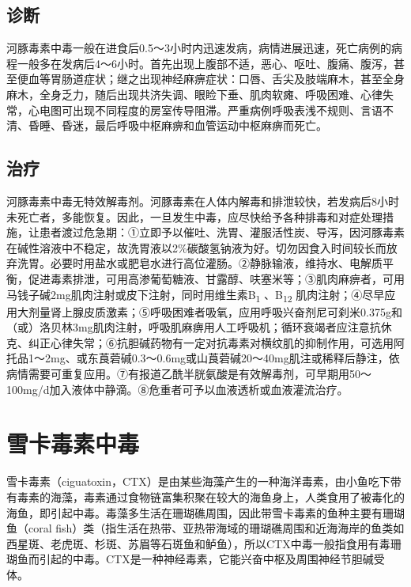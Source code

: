 \subsection{诊断}

河豚毒素中毒一般在进食后0.5～3小时内迅速发病，病情进展迅速，死亡病例的病程一般多在发病后4～6小时。首先出现上腹部不适，恶心、呕吐、腹痛、腹泻，甚至便血等胃肠道症状；继之出现神经麻痹症状：口唇、舌尖及肢端麻木，甚至全身麻木，全身乏力，随后出现共济失调、眼睑下垂、肌肉软瘫、呼吸困难、心律失常，心电图可出现不同程度的房室传导阻滞。严重病例呼吸表浅不规则、言语不清、昏睡、昏迷，最后呼吸中枢麻痹和血管运动中枢麻痹而死亡。

\subsection{治疗}

河豚毒素中毒无特效解毒剂。河豚毒素在人体内解毒和排泄较快，若发病后8小时未死亡者，多能恢复。因此，一旦发生中毒，应尽快给予各种排毒和对症处理措施，让患者渡过危急期：①立即予以催吐、洗胃、灌服活性炭、导泻，因河豚毒素在碱性溶液中不稳定，故洗胃液以2\%碳酸氢钠液为好。切勿因食入时间较长而放弃洗胃。必要时用盐水或肥皂水进行高位灌肠。②静脉输液，维持水、电解质平衡，促进毒素排泄，可用高渗葡萄糖液、甘露醇、呋塞米等；③肌肉麻痹者，可用马钱子碱2mg肌肉注射或皮下注射，同时用维生素B\textsubscript{1}
、B\textsubscript{12}
肌肉注射；④尽早应用大剂量肾上腺皮质激素；⑤呼吸困难者吸氧，应用呼吸兴奋剂尼可刹米0.375g和（或）洛贝林3mg肌肉注射，呼吸肌麻痹用人工呼吸机；循环衰竭者应注意抗休克、纠正心律失常；⑥抗胆碱药物有一定对抗毒素对横纹肌的抑制作用，可选用阿托品1～2mg、或东莨菪碱0.3～0.6mg或山莨菪碱20～40mg肌注或稀释后静注，依病情需要可重复应用。⑦有报道乙酰半胱氨酸是有效解毒剂，可早期用50～100mg/d加入液体中静滴。⑧危重者可予以血液透析或血液灌流治疗。

\protect\hypertarget{text00174.html}{}{}

\section{雪卡毒素中毒}

雪卡毒素（ciguatoxin，CTX）是由某些海藻产生的一种海洋毒素，由小鱼吃下带有毒素的海藻，毒素通过食物链富集积聚在较大的海鱼身上，人类食用了被毒化的海鱼，即引起中毒。毒藻多生活在珊瑚礁周围，因此带雪卡毒素的鱼种主要有珊瑚鱼（coral
fish）类（指生活在热带、亚热带海域的珊瑚礁周围和近海海岸的鱼类如西星斑、老虎斑、杉斑、苏眉等石斑鱼和鲈鱼），所以CTX中毒一般指食用有毒珊瑚鱼而引起的中毒。CTX是一种神经毒素，它能兴奋中枢及周围神经节胆碱受体。

